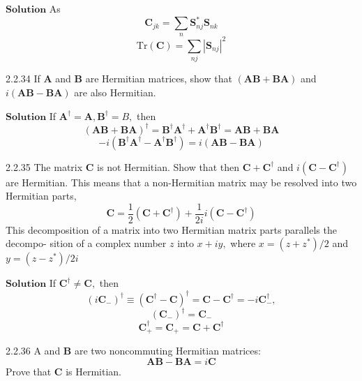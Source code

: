 \documentclass{article}
\begin{document}
\begin{flushleft}
$\boxed{\textbf{Solution}}$ As
$$\mathbf{C}_{j k}=\sum_{n} \boldsymbol{S}_{n j}^{*} \boldsymbol{S}_{n k}$$
$$\text{Tr}(\mathbf{C})=\sum_{n j}\left|\boldsymbol{S}_{n j}\right|^{2}$$



\begin{mybox}{2.2.34}
If $\mathbf{A}$ and $\mathbf{B}$ are Hermitian matrices, show that $(\mathbf{A}\mathbf{B}+\mathbf{BA})$ and $i(\mathbf{A}\mathbf{B}-\mathbf{B}\mathbf{A})$ are also Hermitian.
\end{mybox}

$\boxed{\textbf{Solution}}$  If $\mathbf{A}^{\dagger}=\mathbf{A}, \mathbf{B}^{\dagger}=B,$ then
$$(\mathbf{A}\mathbf{B}+\mathbf{BA})^{\dagger}=\mathbf{B}^{\dagger} \mathbf{A}^{\dagger}+\mathbf{A}^{\dagger} \mathbf{B}^{\dagger}=\mathbf{AB}+\mathbf{BA}$$
$$-i\left(\mathbf{B}^{\dagger} \mathbf{A}^{\dagger}-\mathbf{A}^{\dagger} \mathbf{B}^{\dagger}\right)=i(\mathbf{A}\mathbf{B}-\mathbf{B}\mathbf{A})$$







\begin{mybox}{2.2.35}
The matrix $\mathbf{C}$ is not Hermitian. Show that then $\mathbf{C}+\mathbf{C}^{\dagger}$ and $i\left(\mathbf{C}-\mathbf{C}^{\dagger}\right)$ are Hermitian.
This means that a non-Hermitian matrix may be resolved into two Hermitian parts,
$$
\mathbf{C}=\frac{1}{2}\left(\mathbf{C}+\mathbf{C}^{\dagger}\right)+\frac{1}{2 i} i\left(\mathbf{C}-\mathbf{C}^{\dagger}\right)
$$
This decomposition of a matrix into two Hermitian matrix parts parallels the decompo-
sition of a complex number $z$ into $x+i y,$ where $x=\left(z+z^{*}\right) / 2$ and $y=\left(z-z^{*}\right) / 2 i$
\end{mybox}


$\boxed{\textbf{Solution}}$ If $\mathbf{C}^{\dagger} \neq \mathbf{C},$ then 
$$\left(i \mathbf{C}_{-}\right)^{\dagger} \equiv\left(\mathbf{C}^{\dagger}-\mathbf{C}\right)^{\dagger}=\mathbf{C}-\mathbf{C}^{\dagger}=-i \mathbf{C}_{-}^{\dagger},$$
$$\left(\mathbf{C}_{-}\right)^{\dagger}=\mathbf{C}_{-}$$
$$\mathbf{C}_{+}^{\dagger}=\mathbf{C}_{+}=\mathbf{C}+\mathbf{C}^{\dagger}$$




\begin{mybox}{2.2.36}
A and $\mathbf{B}$ are two noncommuting Hermitian matrices:
$$
\mathbf{AB}-\mathbf{B}\mathbf{A}=i \mathbf{C}
$$
Prove that $\mathbf{C}$ is Hermitian.
\end{mybox}



\end{flushleft}
\end{document}
